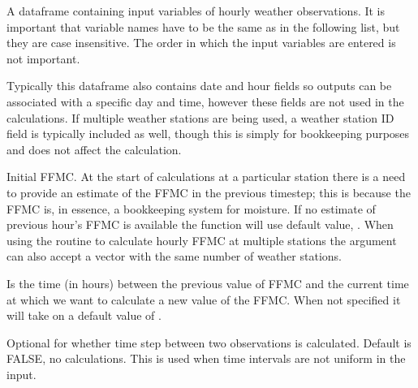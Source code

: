 \documentclass[a4paper]{book}
\begin{document}
\begin{Arguments}
\begin{ldescription}
\item[\code{weatherstream}] A dataframe containing input variables of hourly
weather observations. It is important that variable names have to be the
same as in the following list, but they are case insensitive. The order in
which the input variables are entered is not important.


Typically this dataframe also contains date and
hour fields so outputs can be associated with a specific day and time,
however these fields are not used in the calculations.  If multiple weather
stations are being used, a weather station ID field is typically included as
well, though this is simply for bookkeeping purposes and does not affect the
calculation.

\item[\code{ffmc\_old}] Initial FFMC. At the start of calculations at a particular
station there is a need to provide an estimate of the FFMC in the previous
timestep; this is because the FFMC is, in essence, a bookkeeping system for
moisture.  If no estimate of previous hour's FFMC is available the function
will use default value, . When using the routine to
calculate hourly FFMC at multiple stations the  argument can
also accept a vector with the same number of weather stations.

\item[\code{time.step}] Is the time (in hours) between the previous value of FFMC
and the current time at which we want to calculate a new value of the FFMC.
When not specified it will take on a default value of .

\item[\code{calc.step}] Optional for whether time step between two observations is
calculated. Default is FALSE, no calculations. This is used when time
intervals are not uniform in the input.


\end{ldescription}
\end{Arguments}
\end{document}
